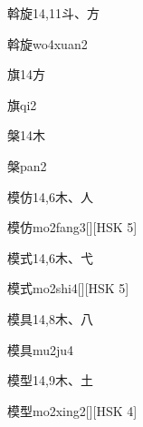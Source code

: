 \begin{entry}{斡旋}{14,11}{⽃、⽅}
  \begin{phonetics}{斡旋}{wo4xuan2}
  \end{phonetics}
\end{entry}

\begin{entry}{旗}{14}{⽅}
  \begin{phonetics}{旗}{qi2}
  \end{phonetics}
\end{entry}

\begin{entry}{槃}{14}{⽊}
  \begin{phonetics}{槃}{pan2}
  \end{phonetics}
\end{entry}

\begin{entry}{模仿}{14,6}{⽊、⼈}
  \begin{phonetics}{模仿}{mo2fang3}[][HSK 5]
  \end{phonetics}
\end{entry}

\begin{entry}{模式}{14,6}{⽊、⼷}
  \begin{phonetics}{模式}{mo2shi4}[][HSK 5]
  \end{phonetics}
\end{entry}

\begin{entry}{模具}{14,8}{⽊、⼋}
  \begin{phonetics}{模具}{mu2ju4}
  \end{phonetics}
\end{entry}

\begin{entry}{模型}{14,9}{⽊、⼟}
  \begin{phonetics}{模型}{mo2xing2}[][HSK 4]
  \end{phonetics}
\end{entry}

